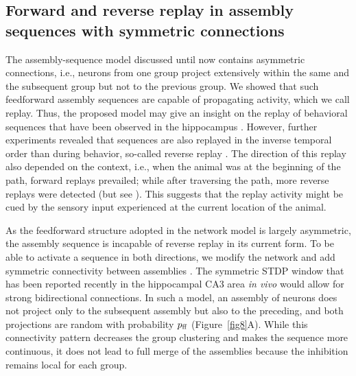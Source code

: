   \subsection{Forward and reverse replay in assembly sequences with symmetric connections}
    The assembly-sequence model discussed until now contains asymmetric
    connections, i.e., neurons from one group project extensively within the
    same and the subsequent group but not to the previous group. We showed that
    such feedforward assembly sequences are capable of propagating activity,
    which we call replay. Thus, the proposed model may give an insight on the
    replay of behavioral sequences that have been observed in the hippocampus
    \citep{Lee2002}. However, further experiments revealed that sequences are
    also replayed in the inverse temporal order than during behavior, so-called
    reverse replay \citep{Foster2006, Diba2007}. The direction of this replay
    also depended on the context, i.e., when the animal was at the beginning of
    the path, forward replays prevailed; while after traversing the path, more
    reverse replays were detected (but see \cite{Karlsson2009}). This suggests
    that the replay activity might be cued by the sensory input experienced at
    the current location of the animal.

    As the feedforward structure adopted in the network model is largely
    asymmetric, the assembly sequence is incapable of reverse replay in its
    current form. To be able to activate a sequence in both directions, we
    modify the network and add symmetric connectivity between assemblies
    \citep{Litwin2014, Sadeh2015}. The symmetric STDP window that has been
    reported recently in the hippocampal CA3 area \textit{in vivo}
    \citep{Mishra2016} would allow for strong bidirectional connections. In such
    a model, an assembly of neurons does not project only to the subsequent
    assembly but also to the preceding, and both projections are random with
    probability $p_{\rm ff}$ (Figure~\ref{fig8}A). While this connectivity pattern
    decreases the group clustering and makes the sequence more continuous, it
    does not lead to full merge of the assemblies because the inhibition
    remains local for each group.


